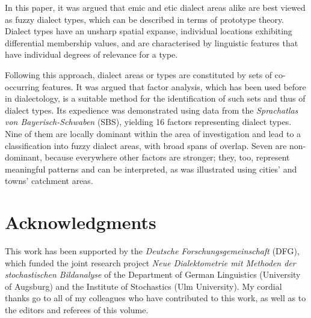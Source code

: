 \documentclass[output=paper]{LSP/langsci}
\begin{document}
In this paper, it was argued that emic and etic dialect areas alike are best viewed as fuzzy dialect types, which can be described in terms of prototype theory. Dialect types have an unsharp spatial expanse, individual locations exhibiting differential membership values, and are characterised by linguistic features that have individual degrees of relevance for a type.

Following this approach, dialect areas or types are constituted by sets of co-occurring features. It was argued that factor analysis, which has been used before in dialectology, is a suitable method for the identification of such sets and thus of dialect types. Its expedience was demonstrated using data from the \textit{Sprachatlas von Bayerisch-Schwaben} (SBS), yielding 16 factors representing dialect types. Nine of them are locally dominant within the area of investigation and lead to a classification into fuzzy dialect areas, with broad spans of overlap. Seven are non-dominant, because everywhere other factors are stronger; they, too, represent meaningful patterns and can be interpreted, as was illustrated using cities’ and towns’ catchment areas.

\section*{Acknowledgments}

This work has been supported by the \textit{Deutsche Forschungsgemeinschaft} (DFG), which funded the joint research project \textit{Neue Dialektometrie mit Methoden der stochastischen Bildanalyse} of the Department of German Linguistics (University of Augsburg) and the Institute of Stochastics (Ulm University). My cordial thanks go to all of my colleagues who have contributed to this work, as well as to the editors and referees of this volume.

\printbibliography[heading=subbibliography,notkeyword=this]
\end{document}
